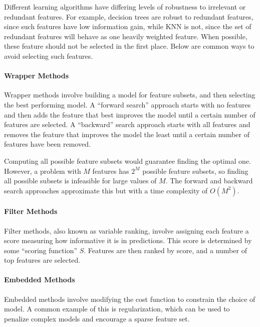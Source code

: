 \documentclass[12pt]{article}
\begin{document}
            Different learning algorithms have differing levels of robustness to irrelevant or redundant features. For example, decision trees are robust
            to redundant features, since such features have low information gain, while KNN is not, since the set of redundant features will behave as one heavily
            weighted feature. When possible, these feature should not be selected in the first place. Below are common ways to avoid selecting such features.

            \paragraph{Wrapper Methods}
            Wrapper methods involve building a model for feature subsets, and then selecting the best performing model. A ``forward search'' approach
            starts with no features and then adds the feature that best improves the model until a certain number of features are selected.  A
            ``backward'' search approach starts with all features and removes the feature that improves the model the least until a certain number
            of features have been removed.

            Computing all possible feature subsets would guarantee finding the optimal one. However, a problem with $M$ features has $2^M$ possible
            feature subsets, so finding all possible subsets is infeasible for large values of $M$. The forward and backward search approaches
            approximate this but with a time complexity of $O(M^2)$.

            \paragraph{Filter Methods}
            Filter methods, also known as variable ranking, involve assigning each feature a score measuring how informative it is in predictions. This
            score is determined by some ``scoring function'' $S$. Features are then ranked by score, and a number of top features are selected.

            \paragraph{Embedded Methods}
            Embedded methods involve  modifying the cost function to constrain the choice of model. A common example of this is regularization, which can
            be used to penalize complex models and encourage a sparse feature set.
\end{document}
